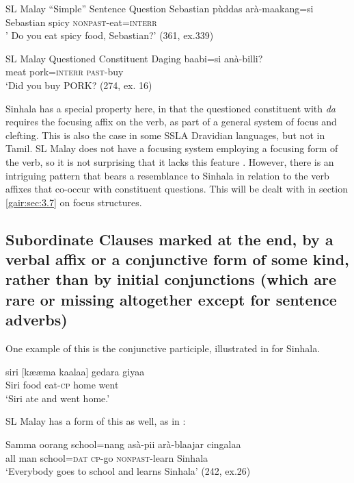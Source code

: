 \ea\label{ex3.1.3} SL Malay ``Simple'' Sentence Question
\gll   Sebastian pùddas arà-maakang=si\\
  Sebastian spicy \textsc{nonpast}-eat=\textsc{interr}\\
'  Do you eat spicy food, Sebastian?' (361, ex.339)
\z




\ea\label{ex3.1.4} SL Malay Questioned Constituent
\gll  Daging baabi=si  anà-billi?\\
  meat pork=\textsc{interr}   \textsc{past}-buy\\
  `Did you buy \textsc{PORK}?  (274, ex. 16)
\z


Sinhala has a special property here, in that the questioned constituent with \textit{da} requires the focusing affix on the verb, as part of a general system of focus and clefting. This is also the case in some SSLA Dravidian languages, but not in Tamil. SL Malay does not have a focusing system  employing a focusing form of the verb, so it is not surprising that it lacks this feature \citep{Slomansontv}. However, there is an intriguing pattern that bears a resemblance to Sinhala in relation to the verb affixes that co-occur with constituent questions. This will be dealt with in section \ref{gair:sec:3.7} on focus structures.

\subsection[Clause final complementizers]{Subordinate Clauses marked at the end, by a verbal affix or a conjunctive form of some kind, rather than by initial conjunctions (which are rare or missing altogether except for sentence adverbs)}\label{gair:sec:3.2} 
 One example of this is the conjunctive participle, illustrated in  for Sinhala. 


\ea\label{ex3.2.1} 
\gll siri [k{\ae}{\ae}ma kaalaa] gedara giyaa\\
Siri  food eat-\textsc{cp} home  went\\
 `Siri ate and went home.'
\z


SL Malay has a form of this as well, as in :


\ea\label{ex3.2.2} 
\gll Samma oorang school=nang asà-pii arà-blaajar cingalaa\\
 all man school=\textsc{dat} \textsc{cp}-go \textsc{nonpast}-learn Sinhala\\
 `Everybody goes to school and learns Sinhala'  (242, ex.26)
\z


